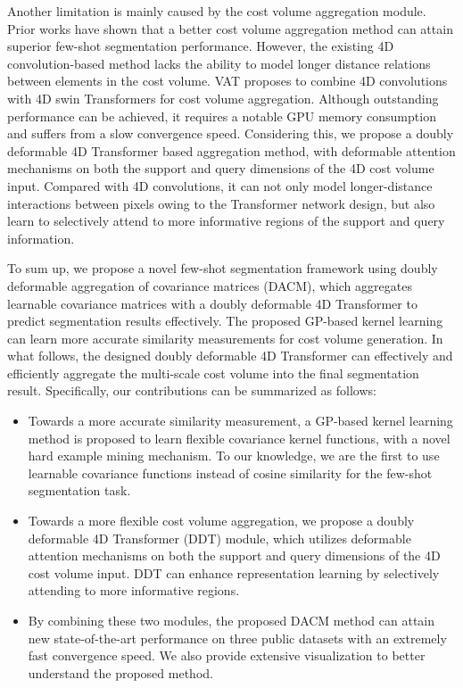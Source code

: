 \documentclass[runningheads]{llncs}
\begin{document}
Another limitation is mainly caused by the cost volume aggregation module. Prior works have shown that a better cost volume aggregation method can attain superior few-shot segmentation performance. However, the existing 4D convolution-based method \cite{min2021hypercorrelation} lacks the ability to model longer distance relations between elements in the cost volume. VAT \cite{hong2021cost} proposes to combine 4D convolutions with 4D swin Transformers \cite{liu2021swin} for cost volume aggregation. Although outstanding performance can be achieved, it requires a notable GPU memory consumption and suffers from a slow convergence speed. Considering this, we propose a doubly deformable 4D Transformer based aggregation method, with deformable attention mechanisms on both the support and query dimensions of the 4D cost volume input. Compared with 4D convolutions, it can not only model longer-distance interactions between pixels owing to the Transformer network design, but also learn to selectively attend to more informative regions of the support and query information. 

To sum up, we propose a novel few-shot segmentation framework using doubly deformable aggregation of covariance matrices (DACM), which aggregates learnable covariance matrices with a doubly deformable 4D Transformer to predict segmentation results effectively. The proposed GP-based kernel learning can learn more accurate similarity measurements for cost volume generation. In what follows, the designed doubly deformable 4D Transformer can effectively and efficiently aggregate the multi-scale cost volume into the final segmentation result. Specifically, our contributions can be summarized as follows:

\begin{itemize}
    \item Towards a more accurate similarity measurement, a GP-based kernel learning method is proposed to learn flexible covariance kernel functions, with a novel hard example mining mechanism. To our knowledge, we are the first to use learnable covariance functions instead of cosine similarity for the few-shot segmentation task.
    
    \item Towards a more flexible cost volume aggregation, we propose a doubly deformable 4D Transformer (DDT) module, which utilizes deformable attention mechanisms on both the support and query dimensions of the 4D cost volume input. DDT can enhance representation learning by selectively attending to more informative regions.
    
    \item By combining these two modules, the proposed DACM method can attain new state-of-the-art performance on three public datasets with an extremely fast convergence speed. We also provide extensive visualization to better understand the proposed method.
\end{itemize}
\end{document}
